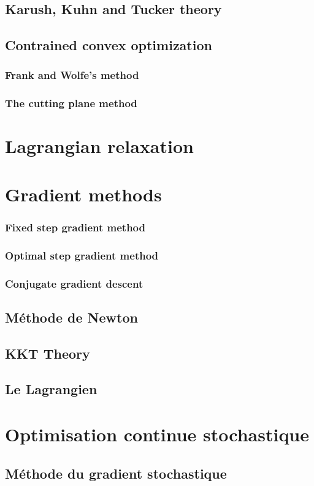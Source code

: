 \documentclass[12pt,openany,oneside]{book}
\theoremstyle{definition}
\numberwithin{definition}{section}
\numberwithin{theorem}{section}
\numberwithin{corollary}{section}
\numberwithin{proposition}{section}
\numberwithin{notation}{section}
\numberwithin{remark}{section}
\numberwithin{hypothesis}{section}
\begin{document}
\subsection{Karush, Kuhn and Tucker theory}
\subsection{Contrained convex optimization}
\subsubsection{Frank and Wolfe's method}
\subsubsection{The cutting plane method}
\section{Lagrangian relaxation}
\section{Gradient methods}
\subsubsection{Fixed step gradient method}
\subsubsection{Optimal step gradient method}
\subsubsection{Conjugate gradient descent}
\subsection{Méthode de Newton}
\subsection{KKT Theory}
\subsection{Le Lagrangien}
\section{Optimisation continue stochastique}
\subsection{Méthode du gradient stochastique}
\end{document}
